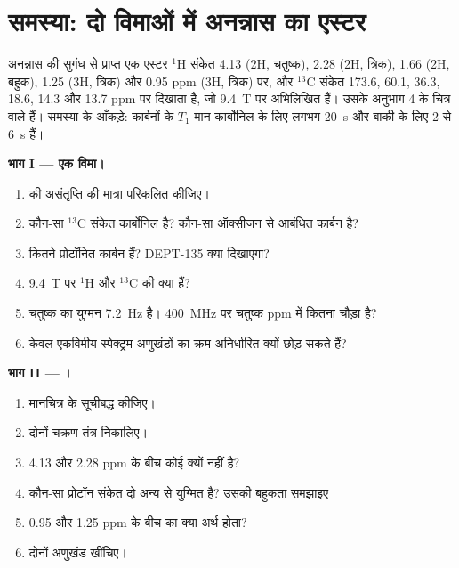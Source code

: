 \section{समस्या: दो विमाओं में अनन्नास का एस्टर}

\begin{problem}
\label{pb:b3:advanced-nmr:1}
अनन्नास की सुगंध से प्राप्त एक एस्टर  ${}^1$H संकेत 4.13 (2H,
चतुष्क), 2.28 (2H, त्रिक), 1.66 (2H, बहुक), 1.25 (3H, त्रिक) और 0.95 ppm (3H, त्रिक) पर, और ${}^{13}$C संकेत
173.6, 60.1, 36.3, 18.6, 14.3 और 13.7 ppm पर दिखाता है, जो \qty{9.4}{T} पर अभिलिखित हैं। उसके  अनुभाग 4 के चित्र वाले हैं। समस्या के आँकड़े: कार्बनों के $T_1$
मान कार्बोनिल के लिए लगभग \qty{20}{s} और बाकी के लिए 2 से \qty{6}{s} हैं।

\medskip\noindent\textbf{भाग I --- एक विमा।}
\begin{enumerate}
  \item {} की असंतृप्ति की मात्रा परिकलित कीजिए।
  \item कौन-सा ${}^{13}$C संकेत कार्बोनिल है? कौन-सा ऑक्सीजन से आबंधित कार्बन है?
  \item कितने प्रोटॉनित कार्बन हैं? DEPT-135 क्या दिखाएगा?
  \item \qty{9.4}{T} पर ${}^1$H और ${}^{13}$C की  क्या हैं?
  \item चतुष्क का युग्मन \qty{7.2}{Hz} है। \qty{400}{MHz} पर चतुष्क ppm में कितना
        चौड़ा है?
  \item केवल एकविमीय स्पेक्ट्रम अणुखंडों का क्रम अनिर्धारित क्यों छोड़ सकते हैं?
\end{enumerate}

\medskip\noindent\textbf{भाग II --- ।}
\begin{enumerate}[resume]
  \item {} मानचित्र के  सूचीबद्ध कीजिए।
  \item दोनों चक्रण तंत्र निकालिए।
  \item 4.13 और 2.28 ppm के बीच कोई  क्यों नहीं है?
  \item कौन-सा प्रोटॉन संकेत दो अन्य से युग्मित है? उसकी बहुकता समझाइए।
  \item 0.95 और 1.25 ppm के बीच  का क्या अर्थ होता?
  \item दोनों अणुखंड खींचिए।
\end{enumerate}


\end{problem}
